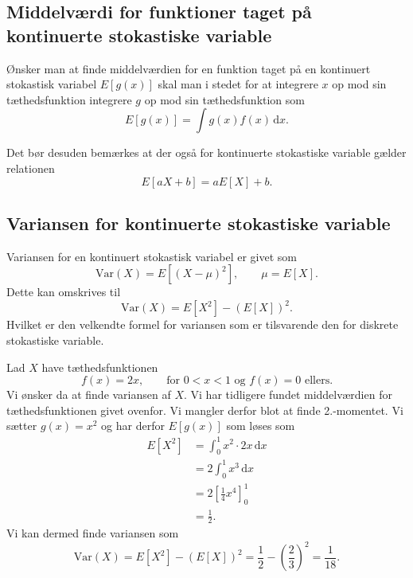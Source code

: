 \subsection{Middelværdi for funktioner taget på kontinuerte stokastiske variable}

\begin{sæt}
  Ønsker man at finde middelværdien for en funktion taget på en kontinuert stokastisk variabel $E[g(x)]$ skal man i stedet for at integrere $x$ op mod sin tæthedsfunktion integrere $g$ op mod sin tæthedsfunktion som
  \[ 
    E[g(x)] = \int g(x) f(x) \, \mathrm{d}x  
  .\]
\end{sæt}

Det bør desuden bemærkes at der også for kontinuerte stokastiske variable gælder relationen
\[ 
  E[aX + b] = aE[X] + b
.\]

\subsection{Variansen for kontinuerte stokastiske variable}

\begin{definition}
  Variansen for en kontinuert stokastisk variabel er givet som
  \[ 
    \mathrm{Var}(X) = E \left[ (X - \mu)^2 \right], \qquad \mu = E[X]
  .\]
  Dette kan omskrives til
  \[ 
    \mathrm{Var}(X) = E \left[ X^2 \right] - (E[X])^2
  .\]
  Hvilket er den velkendte formel for variansen som er tilsvarende den for diskrete stokastiske variable.
\end{definition}

\begin{eks}
  Lad $X$ have tæthedsfunktionen
  \[ 
  f(x) = 2x, \qquad \text{for } 0 < x < 1 \text{ og } f(x) = 0 \text{ ellers}
  .\]
  Vi ønsker da at finde variansen af $X$. Vi har tidligere fundet middelværdien for tæthedsfunktionen givet ovenfor. Vi mangler derfor blot at finde 2.-momentet. Vi sætter $g(x) = x^2$ og har derfor $E[g(x)]$ som løses som
  \begin{align*}
    E \left[ X^2 \right] &= \int_{0}^{1} x^2 \cdot 2x \, \mathrm{d}x  \\
    &= 2 \int_{0}^{1} x^3 \, \mathrm{d}x \\ 
    &= 2 \left[ \frac{1}{4}x^{4} \right]_0^{1} \\
    &= \frac{1}{2}
  .\end{align*}
  Vi kan dermed finde variansen som
  \[ 
    \mathrm{Var}(X) = E \left[ X^2 \right] - (E[X])^2 = \frac{1}{2} - \left( \frac{2}{3} \right)^2 = \frac{1}{18}
  .\]
\end{eks}

